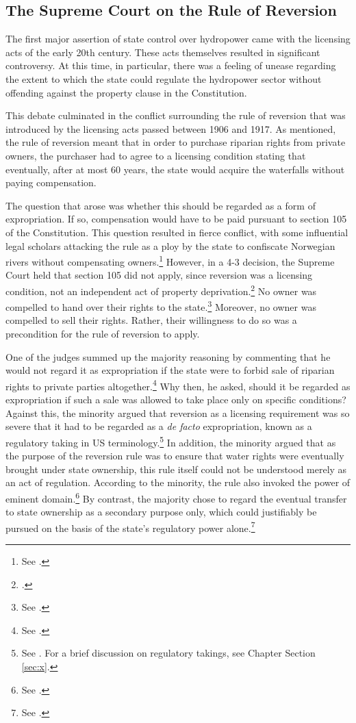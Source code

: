 \subsection{The Supreme Court on the Rule of Reversion}\label{sec:prelib}

The first major assertion of state control over hydropower came with the licensing acts of the early 20th century. These acts themselves resulted in significant controversy. At this time, in particular, there was a feeling of unease regarding the extent to which the state could regulate the hydropower sector without offending against the property clause in the Constitution.

This debate culminated in the conflict surrounding the rule of reversion that was introduced by the licensing acts passed between 1906 and 1917. As mentioned, the rule of reversion meant that in order to purchase riparian rights from private owners, the purchaser had to agree to a licensing condition stating that eventually, after at most 60 years, the state would acquire the waterfalls without paying compensation.

The question that arose was whether this should be regarded as a form of expropriation. If so, compensation would have to be paid pursuant to section 105 of the Constitution. This question resulted in fierce conflict, with some influential legal scholars attacking the rule as a ploy by the state to confiscate Norwegian rivers without compensating owners.\footnote{See \cite{morgenstierne14}.} However, in a 4-3 decision, the Supreme Court held that section 105 did not apply, since reversion was a licensing condition, not an independent act of property deprivation.\footcite{johansen18} No owner was compelled to hand over their rights to the state.\footnote{See \cite[406]{johansen18}.} Moreover, no owner was compelled to sell their rights. Rather, their willingness to do so was a precondition for the rule of reversion to apply.

One of the judges summed up the majority reasoning by commenting that he would not regard it as expropriation if the state were to forbid sale of riparian rights to private parties altogether.\footnote{See \cite[407]{johansen18}.} Why then, he asked, should it be regarded as expropriation if such a sale was allowed to take place only on specific conditions? Against this, the minority argued that reversion as a licensing requirement was so severe that it had to be regarded as a {\it de facto} expropriation, known as a regulatory taking in US terminology.\footnote{See \cite[412-413]{johansen18}. For a brief discussion on regulatory takings, see Chapter \cite{chap:1} Section \ref{sec:x}.} In addition, the minority argued that as the purpose of the reversion rule was to ensure that water rights were eventually brought under state ownership, this rule itself could not be understood merely as an act of regulation. According to the minority, the rule also invoked the power of eminent domain.\footnote{See \cite[415-416]{johansen18}.} By contrast, the majority chose to regard the eventual transfer to state ownership as a secondary purpose only, which could justifiably be pursued on the basis of the state's regulatory power alone.\footnote{See \cite[407]{johansen18}.}

